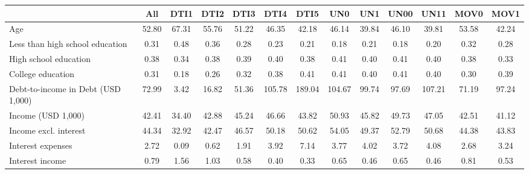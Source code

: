 \begin{table}[htbp]
\begin{tabular}{lcccccccccccc} \hline \hline
 & All  & DTI1  & DTI2  & DTI3  & DTI4  & DTI5  & UN0  & UN1  & UN00  & UN11  & MOV0  & MOV1  \\  \hline 
Age &        52.80 &        67.31 &        55.76 &        51.22 &        46.35 &        42.18 &        46.14 &        39.84 &        46.10 &        39.81 &        53.58 &        42.24 \\  
Less than high school education &         0.31 &         0.48 &         0.36 &         0.28 &         0.23 &         0.21 &         0.18 &         0.21 &         0.18 &         0.20 &         0.32 &         0.28 \\  
High school education &         0.38 &         0.34 &         0.38 &         0.39 &         0.40 &         0.38 &         0.41 &         0.40 &         0.41 &         0.40 &         0.38 &         0.33 \\  
College education &         0.31 &         0.18 &         0.26 &         0.32 &         0.38 &         0.41 &         0.41 &         0.40 &         0.41 &         0.40 &         0.30 &         0.39 \\  
Debt-to-income in %
Debt (USD 1,000) &        72.99 &         3.42 &        16.82 &        51.36 &       105.78 &       189.04 &       104.67 &        99.74 &        97.69 &       107.21 &        71.19 &        97.24 \\  
Income (USD 1,000) &        42.41 &        34.40 &        42.88 &        45.24 &        46.66 &        43.82 &        50.93 &        45.82 &        49.73 &        47.05 &        42.51 &        41.12 \\  
Income excl. interest &        44.34 &        32.92 &        42.47 &        46.57 &        50.18 &        50.62 &        54.05 &        49.37 &        52.79 &        50.68 &        44.38 &        43.83 \\  
Interest expenses &         2.72 &         0.09 &         0.62 &         1.91 &         3.92 &         7.14 &         3.77 &         4.02 &         3.72 &         4.08 &         2.68 &         3.24 \\  
Interest income &         0.79 &         1.56 &         1.03 &         0.58 &         0.40 &         0.33 &         0.65 &         0.46 &         0.65 &         0.46 &         0.81 &         0.53 \\  

\end{tabular}
\end{table}
